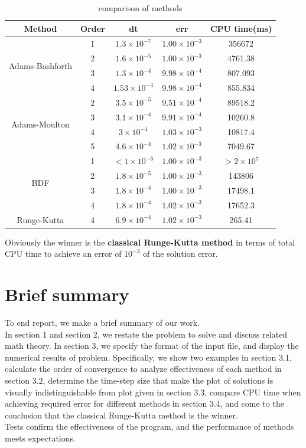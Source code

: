 \documentclass[a4paper,twocolumn]{article}
\theoremstyle{definition}
\begin{document}
\begin{table}[!tp]
	\centering
	\begin{tabular}{|c|c|c|c|c|}
		\hline
		Method & Order & dt & err & CPU time(ms) \\
		\hline	
		\multirow{4}{*}{Adams-Bashforth} & 1 & $1.3\times 10^{-7}$ & $1.00\times 10^{-3}$ 
		& 356672\\
		\cline{2-5}		
		& 2 &$1.6\times 10^{-5}$&$ 1.00\times 10^{-3}$ & 4761.38\\	
		\cline{2-5}		
		& 3 &$1.3\times 10^{-4}$&$ 9.98\times 10^{-4}$ & 807.093 \\	
		\cline{2-5} 
		& 4 &$1.53\times 10^{-4}$&$ 9.98\times 10^{-4}$ & 855.834 \\
		\hline
		\multirow{4}{*}{Adams-Moulton} & 2 & $3.5\times 10^{-5}$&$ 9.51\times 10^{-4}$ 
		&  89518.2 \\
		\cline{2-5}		
		& 3 &$3.1\times 10^{-4}$& $ 9.91\times 10^{-4}$& 10260.8\\	
		\cline{2-5}		
		& 4 &$3\times 10^{-4}$ &$ 1.03\times 10^{-3}$& 10817.4\\	
		\cline{2-5} 
		& 5 &$4.6\times 10^{-4}$ &$ 1.02\times 10^{-3}$ & 7049.67\\
		\hline
		\multirow{4}{*}{BDF} & 1 & $< 1\times 10^{-6}$&$1.00\times 10^{-3}$ 
		& $>2\times 10^{7}$  \\
		\cline{2-5}		
		& 2 &$1.8\times 10^{-5}$& $ 1.00\times 10^{-3}$& 143806\\	
		\cline{2-5}		
		& 3 &$1.8\times 10^{-4}$ &$ 1.00\times 10^{-3}$ & 17498.1\\	
		\cline{2-5} 
		& 4 &$1.8\times 10^{-4}$ &$ 1.02\times 10^{-3}$ & 17652.3\\
		\hline
		Runge-Kutta & 4 & $6.9\times 10^{-4}$ &$ 1.02\times 10^{-3}$ & 265.41\\
		\hline
	\end{tabular}
	\caption{comparison of methods}
	\label{tab:test4}
\end{table}
\twocolumn
\balance
\noindent Obviously the winner is the \textbf{classical Runge-Kutta method} in terms of total CPU time to achieve an error of $10^{-3}$ of the solution error.
\section{Brief summary}
To end report, we make a brief summary of our work.\\
In section 1 and section 2, we restate the problem to solve and discuss related math theory. In section 3, we specify the format of the input file, and display the numerical results of problem. Specifically, we show two examples in section 3.1, calculate the order of convergence to analyze effectiveness of each method in section 3.2, determine the time-step size that make the plot of solutions is visually indistinguishable from plot given in section 3.3,  compare CPU time when achieving required error for different methods in section 3.4, and come to the conclusion that the classical Runge-Kutta method is the winner.\\
Tests confirm the effectiveness of the program, and the performance of  methods meets expectations.
\end{document}
